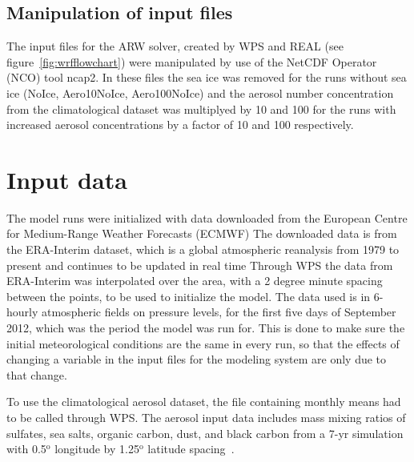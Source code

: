 \subsection{Manipulation of input files}
The input files for the ARW solver, created by WPS and REAL (see figure~\ref{fig:wrfflowchart}) were manipulated by use of the NetCDF Operator (NCO) tool ncap2. In these files the sea ice was removed for the runs without sea ice (NoIce, Aero10NoIce, Aero100NoIce) and the aerosol number concentration from the climatological dataset was multiplyed by 10 and 100 for the runs with increased aerosol concentrations by a factor of 10 and 100 respectively.

\section{Input data}
\label{sec:inputdata}
The model runs were initialized with data downloaded from the European Centre for Medium-Range Weather Forecasts (ECMWF)%
The downloaded data is from the ERA-Interim dataset, which is a global atmospheric reanalysis from 1979 to present and continues to be updated in real time%
Through WPS the data from ERA-Interim was interpolated over the area, with a 2 degree minute spacing between the points, to be used to initialize the model. The data used is in 6-hourly atmospheric fields on pressure levels, for the first five days of September 2012, which was the period the model was run for. This is done to make sure the initial meteorological conditions are the same in every run, so that the effects of changing a variable in the input files for the modeling system are only due to that change.

To use the climatological aerosol dataset, the file containing monthly means had to be called through WPS. The aerosol input data includes mass mixing ratios of sulfates, sea salts, organic carbon, dust, and black carbon from a 7-yr simulation with 0.5$^{\text{o}}$ longitude by 1.25$^{\text{o}}$ latitude spacing~\citep{Thompson2014}.

